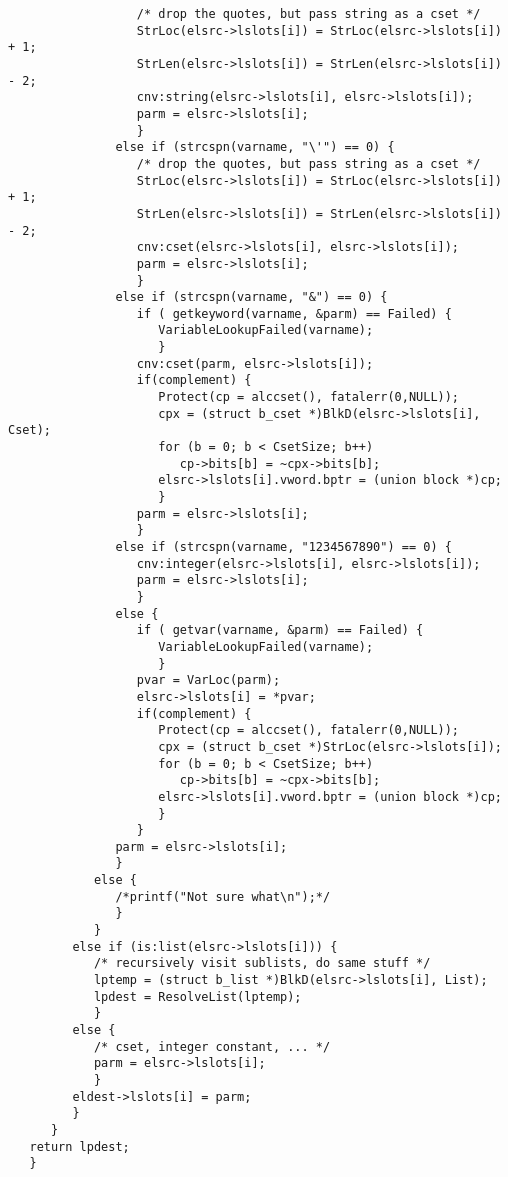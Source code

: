 \documentclass{article}
\begin{document}
\begin{verbatim}
                  /* drop the quotes, but pass string as a cset */
                  StrLoc(elsrc->lslots[i]) = StrLoc(elsrc->lslots[i]) + 1;
                  StrLen(elsrc->lslots[i]) = StrLen(elsrc->lslots[i]) - 2;
                  cnv:string(elsrc->lslots[i], elsrc->lslots[i]);
                  parm = elsrc->lslots[i];
                  }
               else if (strcspn(varname, "\'") == 0) { 
                  /* drop the quotes, but pass string as a cset */
                  StrLoc(elsrc->lslots[i]) = StrLoc(elsrc->lslots[i]) + 1;
                  StrLen(elsrc->lslots[i]) = StrLen(elsrc->lslots[i]) - 2;
                  cnv:cset(elsrc->lslots[i], elsrc->lslots[i]);
                  parm = elsrc->lslots[i];
                  }
               else if (strcspn(varname, "&") == 0) {
                  if ( getkeyword(varname, &parm) == Failed) {
                     VariableLookupFailed(varname);
                     }
                  cnv:cset(parm, elsrc->lslots[i]);
                  if(complement) {
                     Protect(cp = alccset(), fatalerr(0,NULL));
                     cpx = (struct b_cset *)BlkD(elsrc->lslots[i], Cset);
                     for (b = 0; b < CsetSize; b++) 
                        cp->bits[b] = ~cpx->bits[b];
                     elsrc->lslots[i].vword.bptr = (union block *)cp;
                     }
                  parm = elsrc->lslots[i];
                  }
               else if (strcspn(varname, "1234567890") == 0) {
                  cnv:integer(elsrc->lslots[i], elsrc->lslots[i]);
                  parm = elsrc->lslots[i];
                  }
               else {
                  if ( getvar(varname, &parm) == Failed) {
                     VariableLookupFailed(varname);
                     }
                  pvar = VarLoc(parm);
                  elsrc->lslots[i] = *pvar;
                  if(complement) {
                     Protect(cp = alccset(), fatalerr(0,NULL));
                     cpx = (struct b_cset *)StrLoc(elsrc->lslots[i]);
                     for (b = 0; b < CsetSize; b++) 
                        cp->bits[b] = ~cpx->bits[b];
                     elsrc->lslots[i].vword.bptr = (union block *)cp;
                     }
                  }
               parm = elsrc->lslots[i];
               }
            else {
               /*printf("Not sure what\n");*/
               }
            }
         else if (is:list(elsrc->lslots[i])) {
            /* recursively visit sublists, do same stuff */
            lptemp = (struct b_list *)BlkD(elsrc->lslots[i], List);
            lpdest = ResolveList(lptemp);
            }
         else { 
            /* cset, integer constant, ... */
            parm = elsrc->lslots[i];
            }
         eldest->lslots[i] = parm;
         }
      }
   return lpdest;
   }
\end{verbatim}
\end{document}
